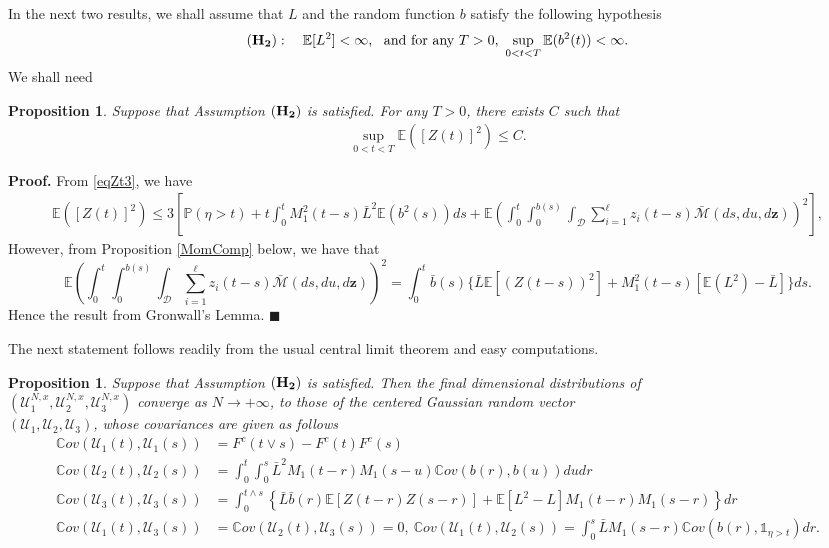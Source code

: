 \documentclass[11pt]{article}
\def\P{{\mathbb P}}
\def\E{{\mathbb E}}
\def\D {\mathcal{D}}
\def\L {\bar{L}}
\def\z {\mathbf{z}}
\newtheorem{proposition}[theorem]{Proposition}
\newenvironment{proof}[1][Proof.]{\textbf{#1} }{\hfill $\blacksquare$}
\begin{document}
In the next two results, we shall assume that $L$ and the random function $b$ satisfy the following hypothesis
\begin{equation*}
{(\bf H_2)}  :  \quad  \E[L^2]<\infty,\ \text{ and for any} \ T>0, \ \sup_{0<t<T} \E(b^2(t))<\infty .
\end{equation*} 
We shall need
 \begin{proposition}\label{M3tC}
Suppose that Assumption ${(\bf H_2)}$ is satisfied. For any $T>0$, there exists $C$ such that 
 \begin{align*}
\sup_{0<t<T} \E([Z(t)]^2)\le C.
\end{align*} 
  \end{proposition} 
\begin{proof}
From \eqref{eqZt3}, we have 
 \begin{align*}
\E([Z(t)]^2) \le 3 \left[ \P(\eta >t)+t\int_0^t M_1^2(t-s) \L^2\E(b^2(s)) ds  + \E\left(\int_0^t \int_0^{b(s)} \int_{\D} \sum_{i=1}^\ell z_i(t-s)  \bar{\mathcal{M}}(ds,du,d\z)\right)^2 \right],
\end{align*} 
However, from Proposition \ref{MomComp} below, we have that 
\[\E\left(\int_0^t \int_0^{b(s)} \int_{\D}\sum_{i=1}^\ell z_i(t-s)  \bar{\mathcal{M}}(ds,du,d\z)\right)^2= 
\int_0^t  \bar{b}(s)\{\L\E[(Z(t-s))^2]+M_1^2(t-s)[\E(L^2)-\L]\} ds.\]
Hence the result from Gronwall's Lemma. 
\end{proof}

The next statement follows readily from the usual central limit theorem and easy computations.
\begin{proposition}\label{fini-dim}
Suppose that Assumption ${(\bf H_2)}$ is satisfied. Then the final dimensional distributions of \\
$(\mathcal{U}^{N,x}_1,\mathcal{U}^{N,x}_2,\mathcal{U}^{N,x}_3)$ converge as $N\rightarrow +\infty$, to those of the centered Gaussian random vector\\ $(\mathcal{U}_1,\mathcal{U}_2,\mathcal{U}_3)$, whose covariances are given as follows
 \begin{align*}
\mathbb{C}ov(\mathcal{U}_1(t),\mathcal{U}_1(s))&=F^c(t \vee s)-F^c(t)F^c(s)\\
\mathbb{C}ov(\mathcal{U}_2(t),\mathcal{U}_2(s))&=\int_0^t \int_0^s \L^2 M_1(t-r)M_1(s-u) \mathbb{C}ov\left( b(r), b(u) \right)dudr\\
\mathbb{C}ov(\mathcal{U}_3(t),\mathcal{U}_3(s))&=\int_0^{t\wedge s}\left\{\L \bar{b}(r) \E[Z(t-r)Z(s-r)]+\E[L^2-L]M_1(t-r)M_1(s-r)\right\}dr\\
\mathbb{C}ov(\mathcal{U}_1(t),\mathcal{U}_3(s))&= \mathbb{C}ov(\mathcal{U}_2(t),\mathcal{U}_3(s))=0,\
\mathbb{C}ov(\mathcal{U}_1(t),\mathcal{U}_2(s))= \int_0^s \L M_1(s-r) \mathbb{C}ov\left( b(r) ,\mathds{1}_{\eta >t} \right)dr.
\end{align*}
\end{proposition}
\end{document}
